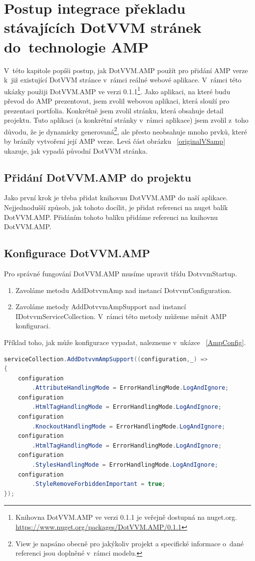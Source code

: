 \chapter{Postup integrace překladu stávajících DotVVM stránek do~technologie AMP}
V~této kapitole popíši postup, jak DotVVM.AMP použít pro přidání AMP verze k~již existující DotVVM stránce v~rámci reálné webové aplikace. V~rámci této ukázky použiji DotVVM.AMP ve verzi 0.1.1\footnote{\label{nuget}Knihovna DotVVM.AMP ve verzi 0.1.1 je veřejně dostupná na nuget.org.\newline
\url{https://www.nuget.org/packages/DotVVM.AMP/0.1.1}}. Jako aplikaci, na které budu převod do AMP prezentovat, jsem zvolil webovou aplikaci, která slouží pro prezentaci portfolia. Konkrétně jsem zvolil stránku, která obsahuje detail projektu. Tuto aplikaci (a konkrétní stránky v~rámci aplikace) jsem zvolil z~toho důvodu, že je dynamicky generovaná\footnote{View je napsáno obecně pro jakýkoliv projekt a specifické informace o~dané referenci jsou doplněné v~rámci modelu. }, ale přesto neobsahuje mnoho prvků, které by bránily vytvoření její AMP verze. Levá část obrázku ~\ref{originalVSamp} ukazuje, jak vypadá původní DotVVM stránka.

\section{Přidání DotVVM.AMP do projektu}
Jako první krok je třeba přidat knihovnu DotVVM.AMP do naší aplikace. Nejjednodušší způsob, jak tohoto docílit, je přidat referenci na nuget balík DotVVM.AMP. Přidáním tohoto balíku přidáme referenci na knihovnu DotVVM.AMP.
\section*{Konfigurace DotVVM.AMP}
Pro správné fungování DotVVM.AMP musíme upravit třídu DotvvmStartup.
\begin{enumerate}
    \item  Zavoláme metodu AddDotvvmAmp nad instancí DotvvmConfiguration.
    \item Zavoláme metody AddDotvvmAmpSupport nad instancí IDotvvmServiceCollection.\newline
    V~rámci této metody můžeme měnit AMP konfiguraci.
\end{enumerate}
Příklad toho, jak může konfigurace vypadat, nalezneme v~ukázce ~\ref{AmpConfig}.

\begin{lstlisting}[language=c#, caption=Ukázka možné AMP konfigurace,label=AmpConfig,captionpos=t]
serviceCollection.AddDotvvmAmpSupport((configuration,_) =>
{
	configuration
	    .AttributeHandlingMode = ErrorHandlingMode.LogAndIgnore;
	configuration
	    .HtmlTagHandlingMode = ErrorHandlingMode.LogAndIgnore;
	configuration
	    .KnockoutHandlingMode = ErrorHandlingMode.LogAndIgnore;
	configuration
	    .HtmlTagHandlingMode = ErrorHandlingMode.LogAndIgnore;
	configuration
	    .StylesHandlingMode = ErrorHandlingMode.LogAndIgnore;
	configuration
	    .StyleRemoveForbiddenImportant = true;
});
\end{lstlisting}

